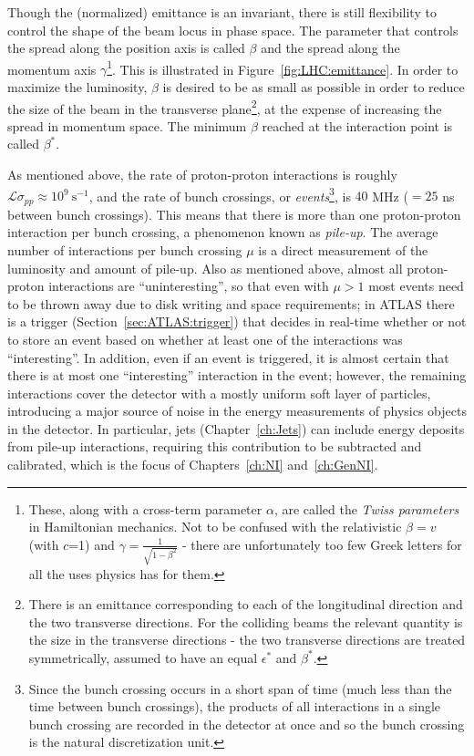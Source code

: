 Though the (normalized) emittance is an invariant, there is still flexibility to control the shape of the beam locus in phase space.
The parameter that controls the spread along the position axis is called $\beta$ and the spread along the momentum axis $\gamma$\footnote{These, along with a cross-term parameter $\alpha$, are called the \textit{Twiss parameters} in Hamiltonian mechanics. Not to be confused with the relativistic $\beta=v$ (with $c$=1) and $\gamma = \frac{1}{\sqrt{1-\beta^2}}$ - there are unfortunately too few Greek letters for all the uses physics has for them.}.
This is illustrated in Figure~\ref{fig:LHC:emittance}.
In order to maximize the luminosity, $\beta$ is desired to be as small as possible in order to reduce the size of the beam in the transverse plane\footnote{There is an emittance corresponding to each of the longitudinal direction and the two transverse directions. For the colliding beams the relevant quantity is the size in the transverse directions - the two transverse directions are treated symmetrically, assumed to have an equal $\epsilon^*$ and $\beta^*$.}, at the expense of increasing the spread in momentum space.
The minimum $\beta$ reached at the interaction point is called $\beta^*$.

As mentioned above, the rate of proton-proton interactions is roughly $\mathcal{L}\sigma_{pp} \approx 10^9~\text{s}^{-1}$, and the rate of bunch crossings, or \textit{events}\footnote{Since the bunch crossing occurs in a short span of time (much less than the time between bunch crossings), the products of all interactions in a single bunch crossing are recorded in the detector at once and so the bunch crossing is the natural discretization unit.}, is $40$ MHz ($=25$ ns between bunch crossings).
This means that there is more than one proton-proton interaction per bunch crossing, a phenomenon known as \textit{pile-up}.
The average number of interactions per bunch crossing $\mu$ is a direct measurement of the luminosity and amount of pile-up.
Also as mentioned above, almost all proton-proton interactions are ``uninteresting'', so that even with $\mu>1$ most events need to be thrown away due to disk writing and space requirements; in ATLAS there is a trigger (Section~\ref{sec:ATLAS:trigger}) that decides in real-time whether or not to store an event based on whether at least one of the interactions was ``interesting''.
In addition, even if an event is triggered, it is almost certain that there is at most one ``interesting'' interaction in the event; however, the remaining interactions cover the detector with a mostly uniform soft layer of particles, introducing a major source of noise in the energy measurements of physics objects in the detector.
In particular, jets (Chapter~\ref{ch:Jets}) can include energy deposits from pile-up interactions, requiring this contribution to be subtracted and calibrated, which is the focus of Chapters~\ref{ch:NI} and~\ref{ch:GenNI}.

